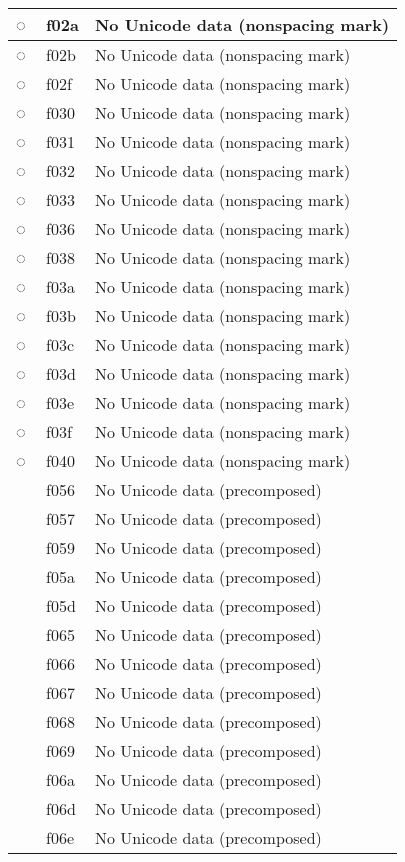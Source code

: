 \documentclass[12pt,letterpaper,openany]{book}
\begin{document}
\begin{center}
\begin{supertabular}{|m{0.25in}|m{0.5in}|m{4in}|}
◌ & f02a & No Unicode data (nonspacing mark)\\\hline
◌ & f02b & No Unicode data (nonspacing mark)\\\hline
◌ & f02f & No Unicode data (nonspacing mark)\\\hline
◌ & f030 & No Unicode data (nonspacing mark)\\\hline
◌ & f031 & No Unicode data (nonspacing mark)\\\hline
◌ & f032 & No Unicode data (nonspacing mark)\\\hline
◌ & f033 & No Unicode data (nonspacing mark)\\\hline
◌ & f036 & No Unicode data (nonspacing mark)\\\hline
◌ & f038 & No Unicode data (nonspacing mark)\\\hline
◌ & f03a & No Unicode data (nonspacing mark)\\\hline
◌ & f03b & No Unicode data (nonspacing mark)\\\hline
◌ & f03c & No Unicode data (nonspacing mark)\\\hline
◌ & f03d & No Unicode data (nonspacing mark)\\\hline
◌ & f03e & No Unicode data (nonspacing mark)\\\hline
◌ & f03f & No Unicode data (nonspacing mark)\\\hline
◌ & f040 & No Unicode data (nonspacing mark)\\\hline
 & f056 & No Unicode data (precomposed)\\\hline
 & f057 & No Unicode data (precomposed)\\\hline
 & f059 & No Unicode data (precomposed)\\\hline
 & f05a & No Unicode data (precomposed)\\\hline
 & f05d & No Unicode data (precomposed)\\\hline
 & f065 & No Unicode data (precomposed)\\\hline
 & f066 & No Unicode data (precomposed)\\\hline
 & f067 & No Unicode data (precomposed)\\\hline
 & f068 & No Unicode data (precomposed)\\\hline
 & f069 & No Unicode data (precomposed)\\\hline
 & f06a & No Unicode data (precomposed)\\\hline
 & f06d & No Unicode data (precomposed)\\\hline
 & f06e & No Unicode data (precomposed)\\\hline

\end{supertabular}
\end{center}
\end{document}
